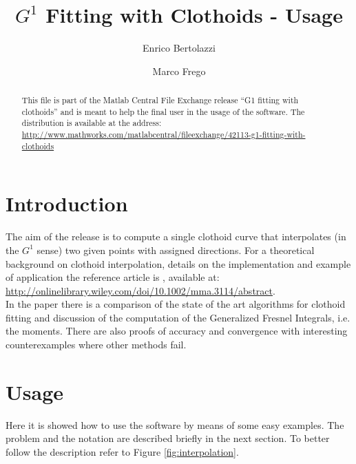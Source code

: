 \documentclass[preprint,3p]{elsarticle}
\newcommand{\vv}{``}
\begin{document}
\begin{frontmatter}


\title{$G^1$ Fitting with Clothoids - Usage}

\author[EB]{Enrico Bertolazzi}

\author[EB]{Marco Frego}

\address[EB]{Department of Industrial Engineering -- University of Trento, Italy}

\begin{abstract}
This file is part of the Matlab Central File Exchange release \vv G1 fitting with clothoids'' and is meant to help the final user in the usage of the software. The distribution is available at the address:\\
 \url{http://www.mathworks.com/matlabcentral/fileexchange/42113-g1-fitting-with-clothoids}
\end{abstract}


\end{frontmatter}


\section{Introduction}
The aim of the release is to compute a single clothoid curve that interpolates (in the $G^1$ sense) two given points with assigned directions. For a theoretical background on clothoid interpolation, details on the implementation and example of application the reference article is \cite{Bertolazzi:2014}, available at:\\
 \url{http://onlinelibrary.wiley.com/doi/10.1002/mma.3114/abstract}. \\
In the paper there is a comparison of the state of the art algorithms for clothoid fitting and  discussion of the computation of the Generalized Fresnel Integrals, i.e. the moments. There are also proofs of accuracy and convergence with interesting counterexamples where other methods fail.

\section{Usage}
Here it is showed how to use the software by means of some easy examples. The problem and the notation are described briefly in the next section. To better follow the description refer to Figure \ref{fig:interpolation}.
\end{document}
